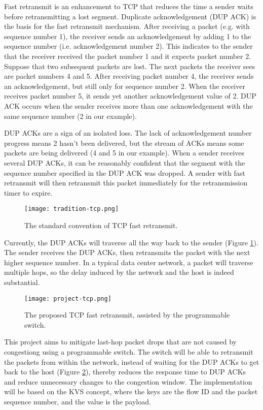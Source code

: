 Fast retransmit is an enhancement to TCP that reduces the time a sender waits before retransmitting a lost segment. Duplicate acknowledgement (DUP ACK) is the basis for the fast retransmit mechanism. After receiving a packet (e.g. with sequence number 1), the receiver sends an acknowledgement by adding 1 to the sequence number (i.e. acknowledgement number 2). This indicates to the sender that the receiver received the packet number 1 and it expects packet number 2. Suppose that two subsequent packets are lost. The next packets the receiver sees are packet numbers 4 and 5. After receiving packet number 4, the receiver sends an acknowledgement, but still only for sequence number 2. When the receiver receives packet number 5, it sends yet another acknowledgement value of 2. DUP ACK occurs when the sender receives more than one acknowledgement with the same sequence number (2 in our example).

DUP ACKs are a sign of an isolated loss. The lack of acknowledgement number progress means 2 hasn’t been delivered, but the stream of ACKs means some packets are being delivered (4 and 5 in our example). When a sender receives several DUP ACKs, it can be reasonably confident that the segment with the sequence number specified in the DUP ACK was dropped. A sender with fast retransmit will then retransmit this packet immediately for the retransmission timer to expire.

\begin{figure}[h]
	\centering
	\texttt{[image: tradition-tcp.png]}
	\caption{The standard convention of TCP fast retransmit.}
	\label{tradition-tcp}
\end{figure}

Currently, the DUP ACKs will traverse all the way back to the sender (Figure \ref{tradition-tcp}). The sender receives the DUP ACKs, then retransmits the packet with the next higher sequence number. In a typical data center network, a packet will traverse multiple hops, so the delay induced by the network and the host is indeed substantial.

\begin{figure}[h]
	\centering
	\texttt{[image: project-tcp.png]}
	\caption{The proposed TCP fast retransmit, assisted by the programmable switch.}
	\label{project-tcp}
\end{figure}

This project aims to mitigate last-hop packet drops that are not caused by congestiong using a programmable switch. The switch will be able to retransmit the packets from within the network, instead of waiting for the DUP ACKs to get back to the host (Figure \ref{project-tcp}), thereby reduces the response time to DUP ACKs and reduce unnecessary changes to the congestion window. The implementation will be based on the KVS concept, where the keys are the flow ID and the packet sequence number, and the value is the payload.

